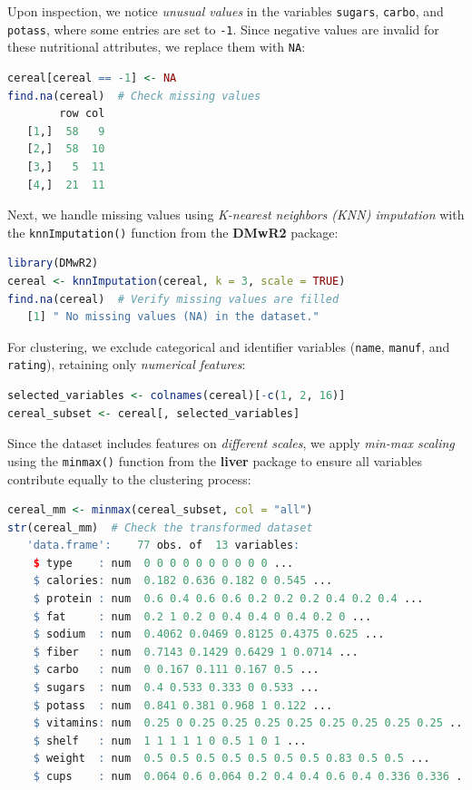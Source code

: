 \documentclass[
  11pt,
]{book}
\newcommand{\passthrough}[1]{#1}
\theoremstyle{definition}
\theoremstyle{definition}
\theoremstyle{definition}
\theoremstyle{definition}
\theoremstyle{remark}
\begin{document}
Upon inspection, we notice \emph{unusual values} in the variables \passthrough{\lstinline!sugars!}, \passthrough{\lstinline!carbo!}, and \passthrough{\lstinline!potass!}, where some entries are set to \passthrough{\lstinline!-1!}. Since negative values are invalid for these nutritional attributes, we replace them with \passthrough{\lstinline!NA!}:

\begin{lstlisting}[language=R]
cereal[cereal == -1] <- NA
find.na(cereal)  # Check missing values
        row col
   [1,]  58   9
   [2,]  58  10
   [3,]   5  11
   [4,]  21  11
\end{lstlisting}

Next, we handle missing values using \emph{K-nearest neighbors (KNN) imputation} with the \passthrough{\lstinline!knnImputation()!} function from the \textbf{DMwR2} package:

\begin{lstlisting}[language=R]
library(DMwR2)
cereal <- knnImputation(cereal, k = 3, scale = TRUE)
find.na(cereal)  # Verify missing values are filled
   [1] " No missing values (NA) in the dataset."
\end{lstlisting}

For clustering, we exclude categorical and identifier variables (\passthrough{\lstinline!name!}, \passthrough{\lstinline!manuf!}, and \passthrough{\lstinline!rating!}), retaining only \emph{numerical features}:

\begin{lstlisting}[language=R]
selected_variables <- colnames(cereal)[-c(1, 2, 16)]
cereal_subset <- cereal[, selected_variables]
\end{lstlisting}

Since the dataset includes features on \emph{different scales}, we apply \emph{min-max scaling} using the \passthrough{\lstinline!minmax()!} function from the \textbf{liver} package to ensure all variables contribute equally to the clustering process:

\begin{lstlisting}[language=R]
cereal_mm <- minmax(cereal_subset, col = "all")
str(cereal_mm)  # Check the transformed dataset
   'data.frame':    77 obs. of  13 variables:
    $ type    : num  0 0 0 0 0 0 0 0 0 0 ...
    $ calories: num  0.182 0.636 0.182 0 0.545 ...
    $ protein : num  0.6 0.4 0.6 0.6 0.2 0.2 0.2 0.4 0.2 0.4 ...
    $ fat     : num  0.2 1 0.2 0 0.4 0.4 0 0.4 0.2 0 ...
    $ sodium  : num  0.4062 0.0469 0.8125 0.4375 0.625 ...
    $ fiber   : num  0.7143 0.1429 0.6429 1 0.0714 ...
    $ carbo   : num  0 0.167 0.111 0.167 0.5 ...
    $ sugars  : num  0.4 0.533 0.333 0 0.533 ...
    $ potass  : num  0.841 0.381 0.968 1 0.122 ...
    $ vitamins: num  0.25 0 0.25 0.25 0.25 0.25 0.25 0.25 0.25 0.25 ...
    $ shelf   : num  1 1 1 1 1 0 0.5 1 0 1 ...
    $ weight  : num  0.5 0.5 0.5 0.5 0.5 0.5 0.5 0.83 0.5 0.5 ...
    $ cups    : num  0.064 0.6 0.064 0.2 0.4 0.4 0.6 0.4 0.336 0.336 ...
\end{lstlisting}
\end{document}
